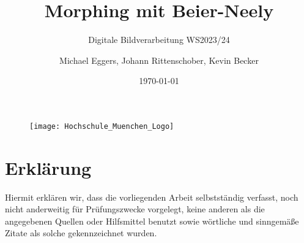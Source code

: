 
\newcommand{\leftblankpage}
{
	\begingroup
	\clearpage
	\vspace*{60mm}
	\noindent
	\centering
	\makebox[0.5\textwidth][c]{\emph{This page intentionally left blank}}
	\clearpage
	\endgroup
}

\subtitle{\LARGE Digitale Bildverarbeitung WS2023/24}
\title{Morphing mit Beier-Neely}
\author{Michael Eggers, Johann Rittenschober, Kevin Becker}
\date{\today}

\maketitle




\begingroup
\begin{figure}[h]
	\centering
		\texttt{[image: Hochschule\_Muenchen\_Logo]}
	\label{fig:HM_FK04_Logo}
\end{figure}
\let\clearpage\relax
\chapter*{Erklärung}
\noindent
Hiermit erklären wir, dass die vorliegenden Arbeit selbstständig verfasst, noch nicht anderweitig für Prüfungszwecke vorgelegt, keine anderen als die angegebenen Quellen oder Hilfsmittel benutzt sowie wörtliche und sinngemäße Zitate als solche gekennzeichnet wurden.
\par
\vspace{20mm}
\noindent
{}

\vspace{20mm}

\noindent
\par
\noindent
{}
\endgroup

